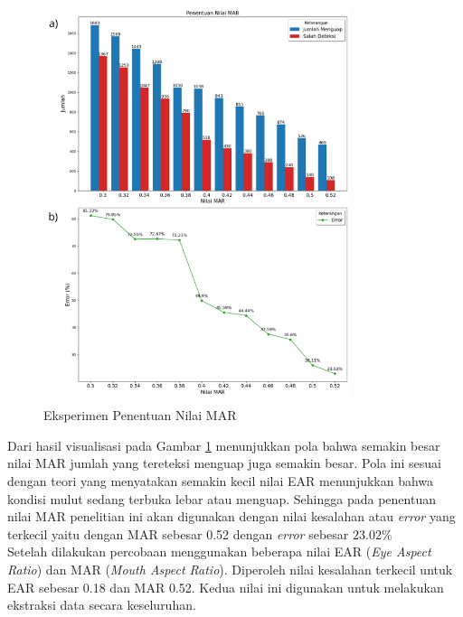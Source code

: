 
         \begin{figure}[H]
               \centering
               \includegraphics[width=0.8\textwidth]{figures/bab4/penentuan nilai mar.png}
               \caption{Eksperimen Penentuan Nilai MAR}
               \label{Eksperimen Penentuan Nilai MAR}

         \end{figure}

        Dari hasil visualisasi pada Gambar \ref{Eksperimen Penentuan Nilai MAR} menunjukkan pola bahwa semakin besar nilai MAR jumlah yang tereteksi 
        menguap juga semakin besar. Pola ini sesuai dengan teori yang menyatakan 
        semakin kecil nilai EAR menunjukkan bahwa kondisi mulut sedang terbuka lebar atau menguap. Sehingga pada penentuan nilai MAR penelitian ini akan digunakan dengan nilai kesalahan atau \textit{error} yang terkecil yaitu dengan MAR sebesar 0.52 dengan \textit{error} sebesar $23.02\%$\\



    Setelah dilakukan percobaan menggunakan beberapa nilai EAR (\textit{Eye Aspect Ratio}) dan MAR (\textit{Mouth Aspect Ratio}). Diperoleh nilai kesalahan terkecil untuk EAR sebesar 0.18 dan MAR 0.52. Kedua nilai ini digunakan untuk melakukan ekstraksi data secara keseluruhan.
    
